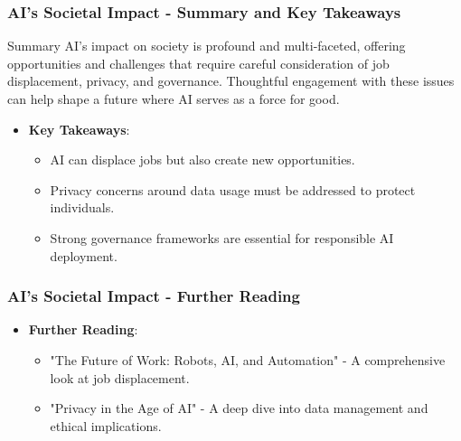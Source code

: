 \documentclass{beamer}
\begin{document}
\begin{frame}[fragile]
    \frametitle{AI's Societal Impact - Summary and Key Takeaways}
    \begin{block}{Summary}
        AI's impact on society is profound and multi-faceted, offering opportunities and challenges that require careful consideration of job displacement, privacy, and governance. 
        Thoughtful engagement with these issues can help shape a future where AI serves as a force for good.
    \end{block}

    \vspace{10pt}

    \begin{itemize}
        \item \textbf{Key Takeaways}:
            \begin{itemize}
                \item AI can displace jobs but also create new opportunities.
                \item Privacy concerns around data usage must be addressed to protect individuals.
                \item Strong governance frameworks are essential for responsible AI deployment.
            \end{itemize}
    \end{itemize}
\end{frame}

\begin{frame}[fragile]
    \frametitle{AI's Societal Impact - Further Reading}
    \begin{itemize}
        \item \textbf{Further Reading}:
            \begin{itemize}
                \item "The Future of Work: Robots, AI, and Automation" - A comprehensive look at job displacement.
                \item "Privacy in the Age of AI" - A deep dive into data management and ethical implications.
            \end{itemize}
    \end{itemize}
\end{frame}
\end{document}
